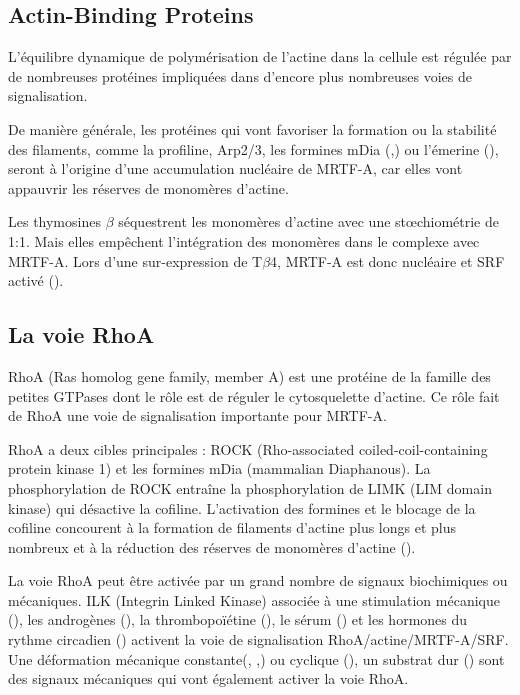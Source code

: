 \subsection{Actin-Binding Proteins}

L'équilibre dynamique de polymérisation de l'actine dans la cellule est régulée par de nombreuses protéines impliquées dans d'encore plus nombreuses voies de signalisation. 

De manière générale, les protéines qui vont favoriser la formation ou la stabilité des filaments, comme la profiline, Arp2/3, les formines mDia (\cite{chan_force-induced_2010},\cite{baarlink_nuclear_2013}) ou l'émerine (\cite{ho_lamin_2013}), seront à l'origine d'une accumulation nucléaire de MRTF-A, car elles vont appauvrir les réserves de monomères d'actine. 



Les thymosines $\beta$ séquestrent les monomères d'actine avec une st\oe chiométrie de 1:1. Mais elles empêchent l'intégration des monomères dans le complexe avec MRTF-A. Lors d'une sur-expression de T$\beta$4, MRTF-A est donc nucléaire et SRF activé (\cite{morita_g-actin_2013}).




\subsection{La voie RhoA}

RhoA (Ras homolog gene family, member A) est une protéine de la famille des petites GTPases dont le rôle est de réguler le cytosquelette d'actine. Ce rôle fait de RhoA une voie de signalisation importante pour MRTF-A. 

RhoA a deux cibles principales : ROCK (Rho-associated coiled-coil-containing protein kinase 1) et les formines mDia (mammalian Diaphanous). La phosphorylation de ROCK entraîne la phosphorylation de LIMK (LIM domain kinase) qui désactive la cofiline. L'activation des formines et le blocage de la cofiline concourent à la formation de filaments d'actine plus longs et plus nombreux et à la réduction des réserves de monomères d'actine (\cite{zhao_force_2007}). 

La voie RhoA peut être activée par un grand nombre de signaux biochimiques ou mécaniques. ILK (Integrin Linked Kinase) associée à une stimulation mécanique (\cite{maier_tenascin-c_2008}), les androgènes (\cite{schmidt_rhoa_2012}), la thrombopoïétine (\cite{smith_induction_2013}), le sérum (\cite{sotiropoulos_signal-regulated_1999}) et les hormones du rythme circadien (\cite{gerber_blood-borne_2013}) activent la voie de signalisation RhoA/actine/MRTF-A/SRF. 
Une déformation mécanique constante(\cite{albinsson_stretch_2004}, \cite{zhao_force_2007},\cite{chan_force-induced_2010}) ou cyclique (\cite{kuwahara_myocardin-related_2010}), un substrat dur (\cite{huang_matrix_2012}) sont des signaux mécaniques qui vont également activer la voie RhoA. 


